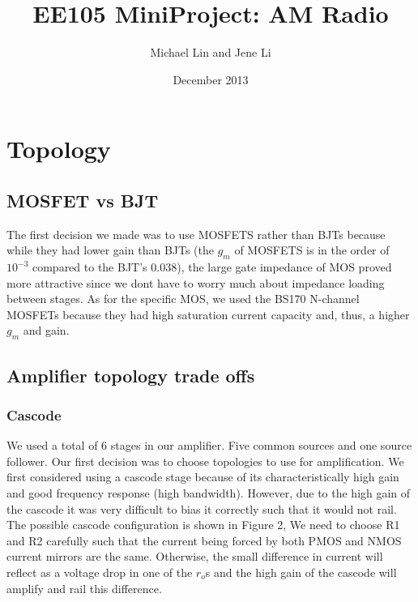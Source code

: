 \documentclass[11pt, twoside, letterpaper]{article}
\title{EE105 MiniProject: AM Radio}
\author{Michael Lin and Jene Li}
\date{December 2013}
\begin{document}
\maketitle

\section{Topology}
\subsection{MOSFET vs BJT}

The first decision we made was to use MOSFETS rather than BJTs because while they had lower gain than BJTs (the $g_m$ of MOSFETS
is in the order of $10^{-3}$ compared to the BJT's $0.038$), the large gate impedance of MOS proved more attractive since we dont have to
worry much about impedance loading between stages. As for the specific MOS, we used the BS170 N-channel MOSFETs because they had high saturation
current capacity and, thus, a higher $g_m$ and gain.

\subsection{Amplifier topology trade offs}

\subsubsection{Cascode}
We used a total of 6 stages in our amplifier. Five common sources and one source follower.
Our first decision was to choose topologies to use for amplification. We first considered using a cascode stage because of 
its characteristically high gain and good frequency response (high bandwidth). However, due to the high gain of the cascode
it was very difficult to bias it correctly such that it would not rail. The possible cascode configuration is shown in Figure 2,
We need to choose R1 and R2 carefully such that the current being forced by both PMOS and NMOS current mirrors are the same.
Otherwise, the small difference in current will reflect as a voltage drop in one of the $r_o$s and the high gain of the cascode
will amplify and rail this difference.
\end{document}
